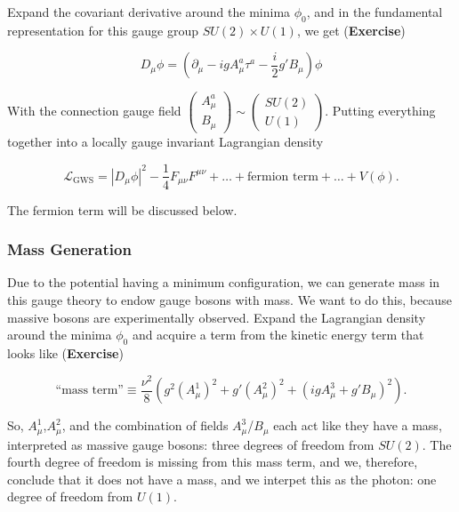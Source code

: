 \noindent Expand the covariant derivative around the minima $\phi_0$, and in the fundamental representation for this gauge group $SU(2) \times U(1)$, we get (\textbf{Exercise})

\begin{equation}
D_\mu \phi = (\partial_\mu - i g A_\mu^a \tau^a - \frac{i}{2} g' B_\mu ) \phi
\end{equation}

\noindent With the connection gauge field $\begin{pmatrix} A_\mu^a \\ B_\mu \end{pmatrix} \sim \begin{pmatrix} SU(2) \\ U(1) \end{pmatrix}$. Putting everything together into a locally gauge invariant Lagrangian density

\begin{equation}
\mathcal{L}_{\text{GWS}} = |D_\mu \phi|^2 - \frac{1}{4}F_{\mu\nu}F^{\mu\nu} + \dots + \text{fermion term} + \dots + V(\phi).
\end{equation}

\noindent The fermion term will be discussed below. \\

\subsubsection*{Mass Generation}

\noindent Due to the potential having a minimum configuration, we can generate mass in this gauge theory to endow gauge bosons with mass. We want to do this, because massive bosons are experimentally observed. Expand the Lagrangian density around the minima $\phi_0$ and acquire a term from the kinetic energy term that looks like (\textbf{Exercise})

\begin{equation}
\text{``mass term''} \equiv \frac{\nu^2}{8} \left( g^2 (A_\mu^1)^2 + g' (A_\mu^2)^2 + (ig A_\mu^3 + g' B_\mu)^2 \right).
\end{equation}

\noindent So, $A_\mu^1$,$ A_\mu^2$, and the combination of fields $A_\mu^3$/$B_\mu$ each act like they have a mass, interpreted as massive gauge bosons: three degrees of freedom from $SU(2)$. The fourth degree of freedom is missing from this mass term, and we, therefore, conclude that it does not have a mass, and we interpet this as the photon: one degree of freedom from $U(1)$. \\

